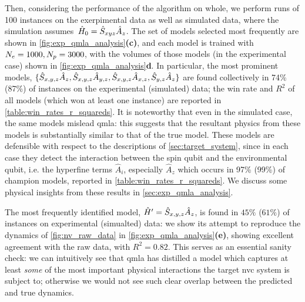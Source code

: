 Then, considering the performance of the algorithm on whole, 
    we perform \glspl{run} of 100 \glspl{instance} on the exerpimental data as well as simulated data,
    where the simulation assumes\footnotemark \ $\hat{H}_0 = \hat{S}_{xyz} \hat{A}_z$.
    The set of models selected most frequently are shown in \cref{fig:exp_qmla_analysis}\textbf{(c)},
    and each model is trained with $N_e=1000, N_p=3000$,
    with the \glspl{volume} of those models (in the experimental case) shown in  \cref{fig:exp_qmla_analysis}\textbf{d}.
In particular, the most prominent models, $\{ \hat{S}_{x,y,z}\hat{A}_{z}, \hat{S}_{x,y,z}\hat{A}_{y,z}, \hat{S}_{x,y,z}\hat{A}_{x,z}, \hat{S}_{y,z}\hat{A}_{z} \}$ are found collectively in 74\% (87\%)
    of \glspl{instance} on the experimental (simulated) data;
    the  \gls{win rate} and $R^2$ of all models (which won at least one instance) are reported in \cref{table:win_rates_r_squareds}. 
It is noteworthy that even in the simulated case, the same models mislead \gls{qmla}:
    this suggests that the resultant physics from these models is substantially similar to that of the  \gls{true model}\footnotemark. 
These models are defensible with respect to the descriptions of \cref{sec:target_system}, 
    since in each case they detect the interaction between the spin qubit and the environmental qubit, 
    i.e. the hyperfine terms $\hat{A}_i$, especially $\hat{A}_z$ which occurs in 97\% (99\%) of \glspl{champion model}, 
    reported in \cref{table:win_rates_r_squareds}. 
We discuss some physical insights from these results in \cref{sec:exp_qmla_analysis}.   
\par 

The most frequently identified model, $\hat{H}^{\prime} = \hat{S}_{x,y,z}\hat{A}_{z}$, is found in $45\%$ ($61\%$) of instances
    on experimental (simualted) data:
    we show its attempt to reproduce the dynamics of \cref{fig:nv_raw_data} in \cref{fig:exp_qmla_analysis}\textbf{(e)}, 
    showing excellent agreement with the raw data, with $R^2=0.82$. 
This serves as an essential sanity check: 
    we can intuitively see that \gls{qmla} has distilled a model which captures at least \emph{some} 
    of the most important physical interactions the target \gls{nvc} system is subject to; 
    otherwise we would not see such clear overlap between the predicted and true dynamics. 
\par 

